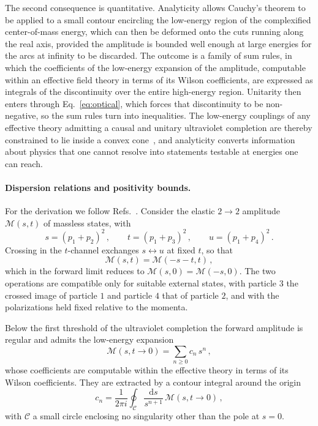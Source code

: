 The second consequence is quantitative. Analyticity allows Cauchy's theorem to be applied to a small
contour encircling the low-energy region of the complexified center-of-mass energy, which can then
be deformed onto the cuts running along the real axis, provided the amplitude is bounded well enough
at large energies for the arcs at infinity to be discarded. The outcome is a family of sum rules, in
which the coefficients of the low-energy expansion of the amplitude, computable within an effective
field theory in terms of its Wilson coefficients, are expressed as integrals of the discontinuity
over the entire high-energy region. Unitarity then enters through Eq.~\eqref{eq:optical}, which
forces that discontinuity to be non-negative, so the sum rules turn into inequalities. The low-energy
couplings of any effective theory admitting a causal and unitary ultraviolet completion are thereby
constrained to lie inside a convex cone~\cite{Arkani-Hamed:2020blm,Adams:2006sv}, and analyticity
converts information about physics that one cannot resolve into statements testable at energies one
can reach.

\paragraph{Dispersion relations and positivity bounds.}
For the derivation we follow Refs.~\cite{Adams:2006sv,Bellazzini:2015cra}. Consider the elastic $2\to2$ amplitude
$\mathcal M(s,t)$ of massless states, with
\begin{equation}
    s=(p_1+p_2)^2\,,\qquad t=(p_1+p_3)^2\,,\qquad u=(p_1+p_4)^2\,.
\end{equation}
Crossing in the $t$-channel exchanges $s\leftrightarrow u$ at fixed $t$, so that
\begin{equation}\label{eq:crossingrelation}
    \mathcal M(s,t) = \mathcal M(-s-t,t)\,,
\end{equation}
which in the forward limit reduces to $\mathcal M(s,0)=\mathcal M(-s,0)$. The two operations are
compatible only for suitable external states, with particle $3$ the crossed image of particle $1$
and particle $4$ that of particle $2$, and with the polarizations held fixed relative to the momenta.

Below the first threshold of the ultraviolet completion the forward amplitude is regular and admits
the low-energy expansion
\begin{equation}\label{eq:lowenergyexp}
    \mathcal M(s,t\to0) = \sum_{n\ge 0} c_n\,s^n\,,
\end{equation}
whose coefficients are computable within the effective theory in terms of its Wilson coefficients.
They are extracted by a contour integral around the origin
\begin{equation}\label{eq:smallcontour}
    c_n = \frac{1}{2\pi i}\oint_{\mathcal C}\frac{\text{d}s}{s^{n+1}}\,\mathcal M(s,t\to0)\,,
\end{equation}
with $\mathcal C$ a small circle enclosing no singularity other than the pole at $s=0$.

